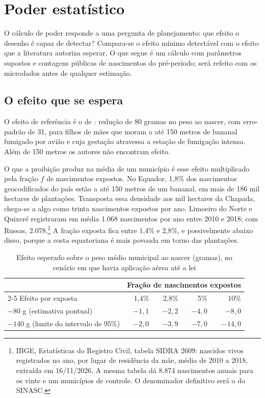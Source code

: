 \section{Poder estatístico}
\label{sec:poder}

O cálculo de poder responde a uma pergunta de planejamento: que efeito o desenho
é capaz de detectar? Compara-se o efeito mínimo detectável com o efeito que a
literatura autoriza esperar. O que segue é um cálculo com parâmetros supostos e
contagens públicas de nascimentos do pré-período; será refeito com os
microdados antes de qualquer estimação.

\subsection{O efeito que se espera}

O efeito de referência é o de : redução de 80 gramas
no peso ao nascer, com erro-padrão de 31, para filhos de mães que moram a até
150 metros de bananal fumigado por avião e cuja gestação atravessa a estação de
fumigação intensa. Além de 150 metros os autores não encontram efeito.

O que a proibição produz na média de um município é esse efeito multiplicado
pela fração $f$ de nascimentos expostos. No Equador, 1,8\% dos nascimentos
geocodificados do país estão a até 150 metros de um bananal, em mais de 186 mil
hectares de plantações. Transposta essa densidade aos mil hectares da Chapada,
chega-se a algo como trinta nascimentos expostos por ano. Limoeiro do Norte e
Quixeré registraram em média 1.068 nascimentos por ano entre 2010 e 2018; com
Russas, 2.078.\footnote{IBGE, Estatísticas do Registro Civil, tabela SIDRA
2609: nascidos vivos registrados no ano, por lugar de residência da mãe, média
de 2010 a 2018, extraída em 16/11/2026. A mesma tabela dá 8.874 nascimentos
anuais para os vinte e um municípios de controle. O denominador definitivo será
o do SINASC.} A fração exposta fica entre 1,4\% e 2,8\%, e possivelmente abaixo
disso, porque a costa equatoriana é mais povoada em torno das plantações.

\begin{table}[ht]
\centering\small
\caption{Efeito esperado sobre o peso médio municipal ao nascer (gramas), no
cenário em que havia aplicação aérea até a lei}
\label{tab:esperado}
\begin{tabular}{@{}lrrrr@{}}
\toprule
 & \multicolumn{4}{c}{Fração de nascimentos expostos} \\
\cmidrule(l){2-5}
Efeito por exposta & 1,4\% & 2,8\% & 5\% & 10\% \\
\midrule
$-80$ g (estimativa pontual) & $-1{,}1$ & $-2{,}2$ & $-4{,}0$ & $-8{,}0$ \\
$-140$ g (limite do intervalo de 95\%) & $-2{,}0$ & $-3{,}9$ & $-7{,}0$ & $-14{,}0$ \\
\bottomrule
\end{tabular}
\end{table}

